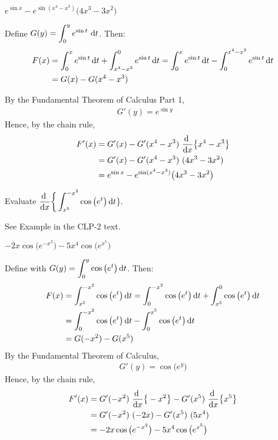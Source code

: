 \begin{answer}
$e^{\sin x}-e^{\sin(x^4-x^3)}\big(4x^3-3x^2\big)$
\end{answer}

\begin{solution}
Define $G(y)=\displaystyle\int_0^ye^{\sin t}\ \mathrm{d}t$. Then:
\begin{align*}
F(x) &= \int_0^x e^{\sin t}\,\mathrm{d}t + \int_{x^4-x^3}^0 e^{\sin t}\,\mathrm{d}t
= \int_0^x e^{\sin t}\,\mathrm{d}t - \int_0^{x^4-x^3} e^{\sin t}\,\mathrm{d}t \\
&=G(x) - G(x^4-x^3)
\end{align*}

By the Fundamental Theorem of Calculus Part 1,
\begin{align*}
G'(y)=e^{\sin y}\qquad
\end{align*}
Hence, by the chain rule,
\begin{align*}
F'(x) &= G'(x)- G'(x^4-x^3)\ \diff{}{x}\big\{x^4-x^3\big\} \\
 &= G'(x)- G'(x^4-x^3)\ (4x^3-3x^2) \\
&=e^{\sin x}-e^{\sin(x^4-x^3)}\big(4x^3-3x^2\big)
\end{align*}
\end{solution}

\begin{Mquestion}[M121 2012A]
Evaluate
$\displaystyle \diff{}{x}\bigg\{\int_{x^5}^{-x^2} \cos\big(e^t\big)\,\dee{t}$\bigg\}.
\end{Mquestion}

\begin{hint}
See Example  in the  CLP-2 text.
\end{hint}

\begin{answer}
$-2x \cos\big(e^{-x^2}\big) -5x^4\cos\big(e^{x^5}\big)$
\end{answer}

\begin{solution}
Define
with
$G(y) = \displaystyle\int_0^y \cos\big(e^t\big)\,\mathrm{d}t$.
Then:
\begin{align*}
F(x) &=  \int_{x^5}^{-x^2} \cos\big(e^t\big)\,\mathrm{d}t
=\int_0^{-x^2} \cos\big(e^t\big)\,\mathrm{d}t + \int_{x^5}^0 \cos\big(e^t\big)\,\mathrm{d}t \\
&=\int_0^{-x^2} \cos\big(e^t\big)\,\mathrm{d}t - \int_0^{x^5} \cos\big(e^t\big)\,\mathrm{d}t \\
&=G(-x^2) - G(x^5)
\end{align*}
By the Fundamental Theorem of Calculus,
\begin{align*}
G'(y)=\cos\big(e^y\big)
\end{align*}
Hence, by the chain rule,
\begin{align*}
F'(x) &= G'(-x^2)\ \diff{}{x}\big\{-x^2\big\} - G'(x^5)\ \diff{}{x}\big\{x^5\big\} \\
 &= G'(-x^2)\ (-2x)- G'(x^5)\ (5x^4) \\
&=-2x \cos\big(e^{-x^2}\big) -5x^4\cos\big(e^{x^5}\big)
\end{align*}
\end{solution}

